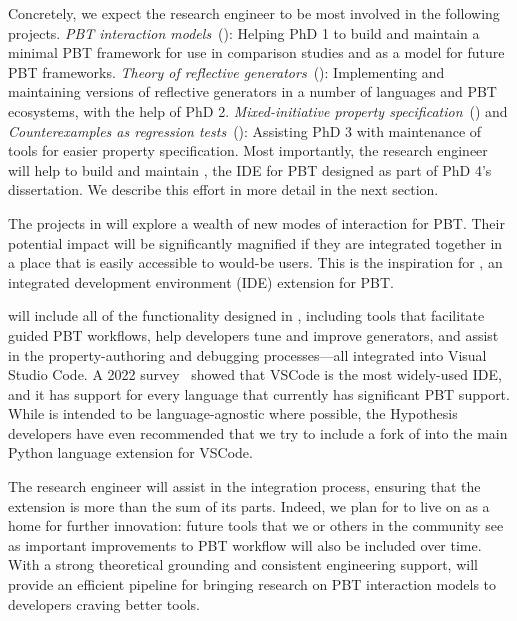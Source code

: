 Concretely, we expect the research engineer to be most involved in the following
projects. {\em PBT interaction models}~(): Helping PhD
  1 to build and maintain a minimal PBT framework for use in comparison studies
  and as a model for future PBT frameworks.
  {\em Theory of reflective generators}~():
  Implementing and maintaining versions of reflective generators in a number of
  languages and PBT ecosystems, with the help of PhD 2.
  {\em Mixed-initiative property
  specification}~() and {\em Counterexamples as
  regression tests}~():
  Assisting PhD
  3 with maintenance of tools for easier property specification.
%
Most importantly, the research engineer will help to build and maintain
\tyche{}, the IDE for PBT designed as part of PhD 4's dissertation. We
describe this effort in more detail in the next section.

The projects in  will explore a wealth of new modes of interaction
for PBT. Their potential impact will be significantly magnified if they are
integrated together in a
place that is easily accessible to would-be users. This is the inspiration for
\tyche{}, an integrated development environment (IDE) extension for PBT.

\tyche{} will include all of the functionality designed in ,
including tools that facilitate guided PBT
workflows, help developers tune and
improve generators, and assist in the property-authoring
and debugging processes---all integrated into Visual Studio Code. A 2022 survey~\cite{noauthor_stack_nodate}
showed that VSCode is the most widely-used IDE, and it has support for every
language that currently has significant PBT support.
While \tyche{} is intended to be language-agnostic where possible, the Hypothesis
developers have even recommended that we try to include a fork of
\tyche{} into the main Python language extension for VSCode.

The research engineer will assist in the integration process, ensuring that the
extension is more than the sum of its parts. Indeed, we plan for \tyche{} to
live on as a home for further innovation: future tools that we or others in the
community see as important improvements to PBT workflow will also be included
over time.  With a strong theoretical grounding and consistent engineering
support, \tyche{} will provide an efficient pipeline for bringing research on
PBT interaction models to developers craving better tools.

